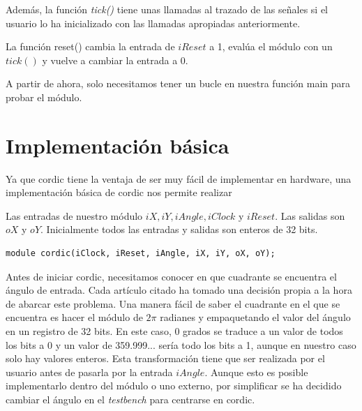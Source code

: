 Además, la función \textit{tick()} tiene unas llamadas al trazado de las señales si el usuario lo ha inicializado con las llamadas apropiadas anteriormente.

La función reset() cambia la entrada de $iReset$ a 1, evalúa el módulo con un $tick()$ y vuelve a cambiar la entrada a 0.

A partir de ahora, solo necesitamos tener un bucle en nuestra función main para probar el módulo.

\section{Implementación básica}
Ya que \gls{cordic} tiene la ventaja de ser muy fácil de implementar en hardware, una implementación básica de \gls{cordic}  nos permite realizar

Las entradas de nuestro módulo $iX, iY, iAngle, iClock$ y $iReset$. Las salidas son $oX$ y $oY$. Inicialmente todos las entradas y salidas son enteros de 32 bits.

\begin{lstlisting}[caption={Módulo \gls{cordic}}]
module cordic(iClock, iReset, iAngle, iX, iY, oX, oY);
\end{lstlisting}

Antes de iniciar \gls{cordic}, necesitamos conocer en que cuadrante se encuentra el ángulo de entrada. Cada artículo citado ha tomado una decisión propia a la hora de abarcar este problema. Una manera fácil de saber el cuadrante en el que se encuentra es hacer el módulo de $2\pi$ radianes y empaquetando el valor del ángulo en un registro de 32 bits. En este caso, 0 grados se traduce a un valor de todos los bits a 0 y un valor de 359.999... sería todo los bits a 1, aunque en nuestro caso solo hay valores enteros. Esta transformación tiene que ser realizada por el usuario antes de pasarla por la entrada $iAngle$. Aunque esto es posible implementarlo dentro del módulo o uno externo, por simplificar se ha decidido cambiar el ángulo en el \textit{testbench} para centrarse en \gls{cordic}.

